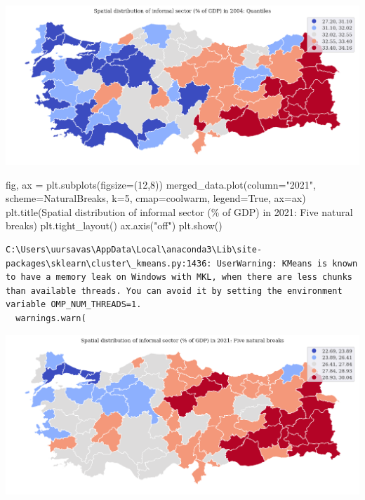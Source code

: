 \documentclass[
  letterpaper,
  DIV=11,
  numbers=noendperiod]{scrreprt}
\newenvironment{Shaded}{\begin{snugshade}}{\end{snugshade}}
\newcommand{\DecValTok}[1]{\textcolor[rgb]{0.68,0.00,0.00}{#1}}
\newcommand{\NormalTok}[1]{\textcolor[rgb]{0.00,0.23,0.31}{#1}}
\newcommand{\OperatorTok}[1]{\textcolor[rgb]{0.37,0.37,0.37}{#1}}
\newcommand{\SpecialCharTok}[1]{\textcolor[rgb]{0.37,0.37,0.37}{#1}}
\newcommand{\StringTok}[1]{\textcolor[rgb]{0.13,0.47,0.30}{#1}}
\newcommand{\VariableTok}[1]{\textcolor[rgb]{0.07,0.07,0.07}{#1}}
\begin{document}
\includegraphics{labs/final_informal_files/figure-pdf/cell-5-output-1.png}

\begin{Shaded}
\begin{Highlighting}[]
\NormalTok{fig, ax }\OperatorTok{=}\NormalTok{ plt.subplots(figsize}\OperatorTok{=}\NormalTok{(}\DecValTok{12}\NormalTok{,}\DecValTok{8}\NormalTok{))}
\NormalTok{merged\_data.plot(column}\OperatorTok{=}\StringTok{"2021"}\NormalTok{, scheme}\OperatorTok{=}\StringTok{\textquotesingle{}NaturalBreaks\textquotesingle{}}\NormalTok{, k}\OperatorTok{=}\DecValTok{5}\NormalTok{, cmap}\OperatorTok{=}\StringTok{\textquotesingle{}coolwarm\textquotesingle{}}\NormalTok{, legend}\OperatorTok{=}\VariableTok{True}\NormalTok{, ax}\OperatorTok{=}\NormalTok{ax)}
\NormalTok{plt.title(}\StringTok{\textquotesingle{}Spatial distribution of informal sector (}\SpecialCharTok{\% o}\StringTok{f GDP) in 2021: Five natural breaks\textquotesingle{}}\NormalTok{)}
\NormalTok{plt.tight\_layout()}
\NormalTok{ax.axis(}\StringTok{"off"}\NormalTok{)}
\NormalTok{plt.show()}
\end{Highlighting}
\end{Shaded}

\begin{verbatim}
C:\Users\uursavas\AppData\Local\anaconda3\Lib\site-packages\sklearn\cluster\_kmeans.py:1436: UserWarning: KMeans is known to have a memory leak on Windows with MKL, when there are less chunks than available threads. You can avoid it by setting the environment variable OMP_NUM_THREADS=1.
  warnings.warn(
\end{verbatim}

\includegraphics{labs/final_informal_files/figure-pdf/cell-6-output-2.png}
\end{document}
